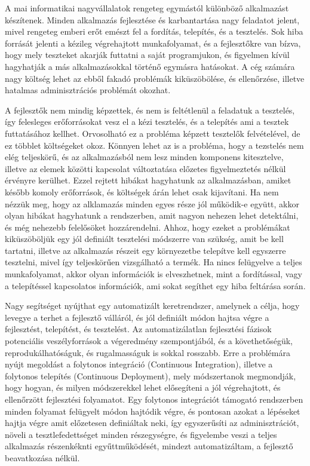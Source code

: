 \documentclass[11pt,magyar,a4paper,twoside,]{report}
\begin{document}
A mai informatikai nagyvállalatok rengeteg egymástól különböző
alkalmazást készítenek. Minden alkalmazás fejlesztése és karbantartása
nagy feladatot jelent, mivel rengeteg emberi erőt emészt fel a fordítás,
telepítés, és a tesztelés. Sok hiba forrását jelenti a kézileg
végrehajtott munkafolyamat, és a fejlesztőkre van bízva, hogy mely
teszteket akarják futtatni a saját programjukon, és figyelmen kívül
hagyhatják a más alkalmazásokkal történő egymásra hatásokat. A cég
számára nagy költség lehet az ebből fakadó problémák kiküszöbölése, és
ellenőrzése, illetve hatalmas adminisztrációs problémát okozhat.

A fejlesztők nem mindig képzettek, és nem is feltétlenül a feladatuk a
tesztelés, így felesleges erőforrásokat vesz el a kézi tesztelés, és a
telepítés ami a tesztek futtatásához kellhet. Orvosolható ez a probléma
képzett tesztelők felvételével, de ez többlet költségeket okoz. Könnyen
lehet az is a probléma, hogy a tezstelés nem elég teljeskörű, és az
alkalmazásból nem lesz minden komponens kitesztelve, illetve az elemek
közötti kapcsolat változtatása előzetes figyelmeztetés nélkül érvényre
kerülhet. Ezzel rejtett hibákat hagyhatunk az alkalmazásban, amiket
később komoly erőforrások, és költségek árán lehet csak kijavítani. Ha
nem nézzük meg, hogy az alklamazás minden egyes része jól működik-e
együtt, akkor olyan hibákat hagyhatunk a rendszerben, amit nagyon
nehezen lehet detektálni, és még nehezebb felelősöket hozzárendelni.
Ahhoz, hogy ezeket a problémákat kiküszöböljük egy jól definiált
tesztelési módszerre van szükség, amit be kell tartatni, illetve az
alkalmazás részeit egy környezetbe telepítve kell egyszerre tesztelni,
mivel így teljeskörűen vizsgálható a termék. Ha nincs felügyelve a
teljes munkafolyamat, akkor olyan információk is elveszhetnek, mint a
fordítással, vagy a telepítéssel kapcsolatos információk, ami sokat
segíthet egy hiba feltárása során.

Nagy segítséget nyújthat egy automatizált keretrendszer, amelynek a
célja, hogy levegye a terhet a fejlesztő válláról, és jól definiált
módon hajtsa végre a fejlesztést, telepítést, és tesztelést. Az
automatizálatlan fejlesztési fázisok potenciális veszélyforrások a
végeredmény szempontjából, és a követhetőségük, reprodukálhatóságuk, és
rugalmasságuk is sokkal rosszabb. Erre a problémára nyújt megoldást a
folytonos integráció (Continuous Integration), illetve a folytonos
telepítés (Continuous Deployment), mely módszertanok megmondják, hogy
hogyan, és milyen módszerekkel lehet elősegíteni a jól végrehajtott, és
ellenőrzött fejlesztési folyamatot. Egy folytonos integrációt támogató
rendszerben minden folyamat felügyelt módon hajtódik végre, és pontosan
azokat a lépéseket hajtja végre amit előzetesen definiáltak neki, így
egyszerűsíti az adminisztrációt, növeli a tesztlefedettséget minden
részegységre, és figyelembe veszi a teljes alkalmazás részenkéknti
egyűttműködését, mindezt automatizáltam, a fejlesztő beavatkozása
nélkül.
\end{document}
